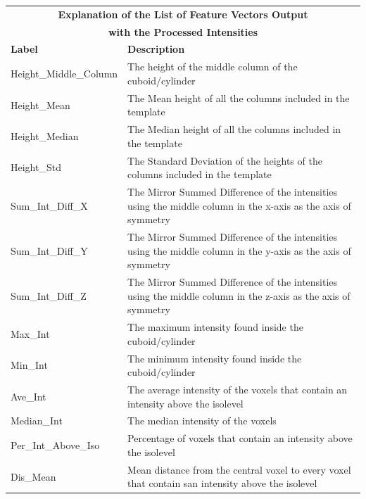 \documentclass{subfiles}
\begin{document}
	
		
		\newpage
		\begin{longtable}
			{|p{4.65cm}|p{8.85cm}|}
			\toprule
			\multicolumn{2}{|c|}{\textbf{Explanation of the List of Feature Vectors Output }} \\
				\multicolumn{2}{|c|}{\textbf{ with the Processed Intensities}} \\
			\midrule
			\textbf{Label} & \textbf{Description} \\ 
			\cmidrule(r){1-1}\cmidrule(l){2-2}
			Height\_Middle\_Column& The height of the middle column of the cuboid/cylinder
			\\
			\cmidrule(r){1-1}\cmidrule(l){2-2}
			Height\_Mean& The Mean height of all the columns included in the template\\
			\cmidrule(r){1-1}\cmidrule(l){2-2}
			Height\_Median& The Median height of all the columns included in the template
			\\
			\cmidrule(r){1-1}\cmidrule(l){2-2}
			Height\_Std&The Standard Deviation of the heights of the columns included in the template \\
			\cmidrule(r){1-1}\cmidrule(l){2-2}
			Sum\_Int\_Diff\_X& The Mirror Summed Difference of the intensities using the middle column in the x-axis as the axis of symmetry \\
			\cmidrule(r){1-1}\cmidrule(l){2-2}
			Sum\_Int\_Diff\_Y& The Mirror Summed Difference of the intensities using the middle column in the y-axis as the axis of symmetry\\
			\cmidrule(r){1-1}\cmidrule(l){2-2}
			Sum\_Int\_Diff\_Z& The Mirror Summed Difference of the intensities using the middle column in the z-axis as the axis of symmetry\\
			\cmidrule(r){1-1}\cmidrule(l){2-2}
			Max\_Int& The maximum intensity found inside the cuboid/cylinder\\
			\cmidrule(r){1-1}\cmidrule(l){2-2}
			Min\_Int& The minimum intensity found inside the cuboid/cylinder\\
			\cmidrule(r){1-1}\cmidrule(l){2-2}
			Ave\_Int& The average intensity of the voxels that contain an intensity above the isolevel\\
			\cmidrule(r){1-1}\cmidrule(l){2-2}
			Median\_Int& The median intensity of the voxels\\
			\cmidrule(r){1-1}\cmidrule(l){2-2}
			Per\_Int\_Above\_Iso& Percentage of voxels that contain an intensity above the isolevel\\
			\cmidrule(r){1-1}\cmidrule(l){2-2}
			Dis\_Mean& Mean distance from the central voxel to every voxel that contain san intensity above the isolevel  \\

\end{longtable}
\end{document}
